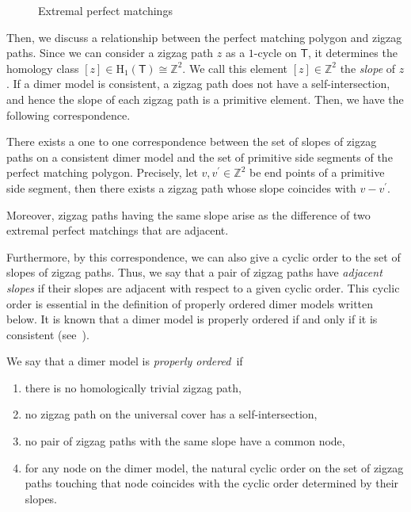 \documentclass[ALCO,ThmDefs,Unicode]{cedram}
\newcommand{\rmH}{\mathrm{H}}
\newcommand{\ZZ}{\mathbb{Z}}
\newcommand{\sfT}{\mathsf{T}}
\begin{document}
\begin{figure}[H]
{{\begin{tikzpicture}
\end{tikzpicture}
}}
\caption{Extremal perfect matchings}
\label{pm_4a}
\end{figure}

Then, we discuss a relationship between the perfect matching polygon and zigzag paths. Since we can consider a zigzag path $z$ as a $1$-cycle on $\sfT$, it determines the homology class $[z]\in\rmH_1(\sfT)\cong\ZZ^2$. We call this element $[z]\in\ZZ^2$ the \emph{slope} of $z$. If a dimer model is consistent, a zigzag path does not have a self-intersection, and hence the slope of each zigzag path is a primitive element. Then, we have the following correspondence.

\begin{prop}\label{zigzag_sidepolygon}
There exists a one to one correspondence between the set of slopes of zigzag paths on a consistent dimer model and the set of primitive side segments of the perfect matching polygon. Precisely, let $v,v^\prime\in\ZZ^2$ be end points of a primitive side segment, then there exists a zigzag path whose slope coincides with $v-v^\prime$.

Moreover, zigzag paths having the same slope arise as the difference of two extremal perfect matchings that are adjacent.
\end{prop}

Furthermore, by this correspondence, we can also give a cyclic order to the set of slopes of zigzag paths. Thus, we say that a pair of zigzag paths have \emph{adjacent slopes} if their slopes are adjacent with respect to a given cyclic order. This cyclic order is essential in the definition of properly ordered dimer models written below. It is known that a dimer model is properly ordered if and only if it is consistent (see~\cite[Proposition~4.4]{IU1}).

\begin{defi}\label{def_properly}
We say that a dimer model is \emph{properly ordered}~if
\begin{enumerate}%
\item there is no homologically trivial zigzag path,
\item no zigzag path on the universal cover has a self-intersection,
\item no pair of zigzag paths with the same slope have a common node,
\item for any node on the dimer model, the natural cyclic order on the set of zigzag paths touching that node coincides with the cyclic order determined by their slopes.
\end{enumerate}
\end{defi}
\end{document}
